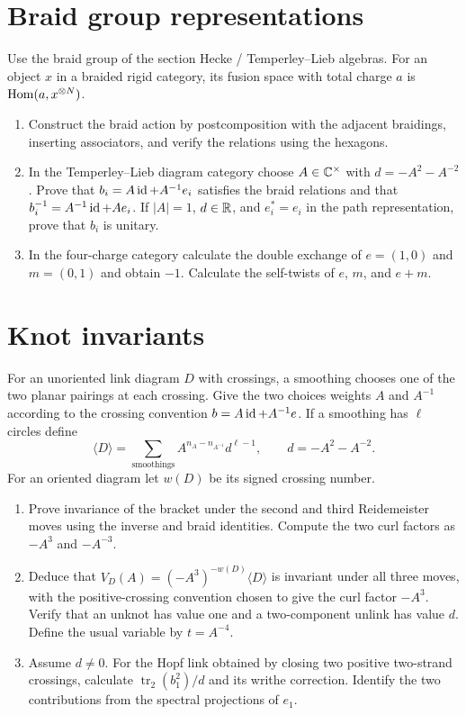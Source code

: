 \section{Braid group representations}

\begin{exercise}
Use the braid group of the section Hecke / Temperley--Lieb
algebras. For an object $x$ in a braided rigid category,
its fusion space with total charge $a$ is
$\operatorname{Hom}(a,x^{\otimes N})$.
\begin{enumerate}[label=(\alph*)]
\item Construct the braid action by postcomposition with
the adjacent braidings, inserting associators, and verify
the relations using the hexagons.
\item In the Temperley--Lieb diagram category choose
$A\in\mathbb C^\times$ with $d=-A^2-A^{-2}$. Prove that
$b_i=A\operatorname{id}+A^{-1}e_i$ satisfies the braid relations and that
$b_i^{-1}=A^{-1}\operatorname{id}+Ae_i$.
If $|A|=1$, $d\in\mathbb R$, and $e_i^*=e_i$ in the path
representation, prove that $b_i$ is unitary.
\item In the four-charge category calculate the double
exchange of $e=(1,0)$ and $m=(0,1)$ and obtain $-1$.
Calculate the self-twists of $e$, $m$, and $e+m$.
\end{enumerate}
\end{exercise}

\section{Knot invariants}

\begin{exercise}
For an unoriented link diagram $D$ with crossings, a smoothing
chooses one of the two planar pairings at each crossing.
Give the two choices weights $A$ and $A^{-1}$ according to
the crossing convention $b=A\operatorname{id}+A^{-1}e$. If a smoothing
has $\ell$ circles define
\[
 \langle D\rangle=\sum_{\text{smoothings}}
          A^{n_A-n_{A^{-1}}}d^{\ell-1},
 \qquad d=-A^2-A^{-2}.
\]
For an oriented diagram let $w(D)$ be its signed crossing number.
\begin{enumerate}[label=(\alph*)]
\item Prove invariance of the bracket under the second and
third Reidemeister moves using the inverse and braid identities.
Compute the two curl factors as $-A^3$ and $-A^{-3}$.
\item Deduce that
$V_D(A)=(-A^3)^{-w(D)}\langle D\rangle$
is invariant under all three moves, with the positive-crossing
convention chosen to give the curl factor $-A^3$.
Verify that an unknot has value one and a two-component
unlink has value $d$. Define the usual variable by $t=A^{-4}$.
\item Assume $d\ne0$. For the Hopf link obtained by closing two positive
two-strand crossings, calculate
$\operatorname{tr}_2(b_1^2)/d$ and its writhe correction.
Identify the two contributions from the spectral projections
of $e_1$.
\end{enumerate}
\end{exercise}

